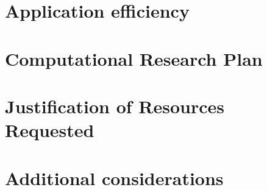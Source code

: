 \documentclass[a4paper, 10pt, notitlepage]{nsf}
\begin{document}
\section{Application efficiency}

% 
\section{Computational Research Plan}
\label{sec:research_plan}

\section{Justification of Resources Requested}

\section{Additional considerations}


%
\newpage


\end{document}
